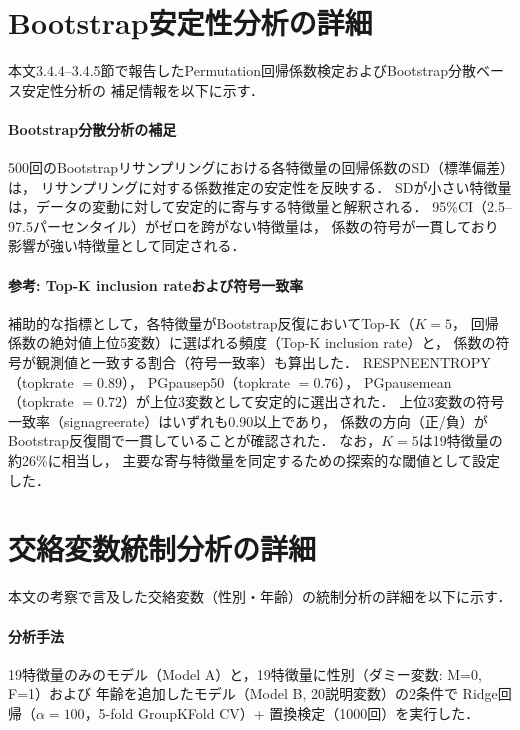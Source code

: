 \documentclass[dvipdfmx,11pt,a4paper]{bxjsarticle}
\renewcommand{\_}{\paperorigunderscore\allowbreak}%
\begin{document}
\section{Bootstrap安定性分析の詳細}
\label{sec:appendix_bootstrap}

本文3.4.4--3.4.5節で報告したPermutation回帰係数検定およびBootstrap分散ベース安定性分析の
補足情報を以下に示す．

\paragraph{Bootstrap分散分析の補足}
500回のBootstrapリサンプリングにおける各特徴量の回帰係数のSD（標準偏差）は，
リサンプリングに対する係数推定の安定性を反映する．
SDが小さい特徴量は，データの変動に対して安定的に寄与する特徴量と解釈される．
95\%CI（2.5--97.5パーセンタイル）がゼロを跨がない特徴量は，
係数の符号が一貫しており影響が強い特徴量として同定される．

\paragraph{参考: Top-K inclusion rateおよび符号一致率}
補助的な指標として，各特徴量がBootstrap反復においてTop-K（$K = 5$，
回帰係数の絶対値上位5変数）に選ばれる頻度（Top-K inclusion rate）と，
係数の符号が観測値と一致する割合（符号一致率）も算出した．
RESP\_NE\_ENTROPY（topk\_rate $= 0.89$），
PG\_pause\_p50（topk\_rate $= 0.76$），
PG\_pause\_mean（topk\_rate $= 0.72$）が上位3変数として安定的に選出された．
上位3変数の符号一致率（sign\_agree\_rate）はいずれも0.90以上であり，
係数の方向（正/負）がBootstrap反復間で一貫していることが確認された．
なお，$K = 5$は19特徴量の約26\%に相当し，
主要な寄与特徴量を同定するための探索的な閾値として設定した．

\section{交絡変数統制分析の詳細}
\label{sec:appendix_confound}

本文の考察で言及した交絡変数（性別・年齢）の統制分析の詳細を以下に示す．

\paragraph{分析手法}
19特徴量のみのモデル（Model A）と，19特徴量に性別（ダミー変数: M=0, F=1）および
年齢を追加したモデル（Model B, 20説明変数）の2条件で
Ridge回帰（$\alpha = 100$，5-fold GroupKFold CV）+ 置換検定（1000回）を実行した．
\end{document}
